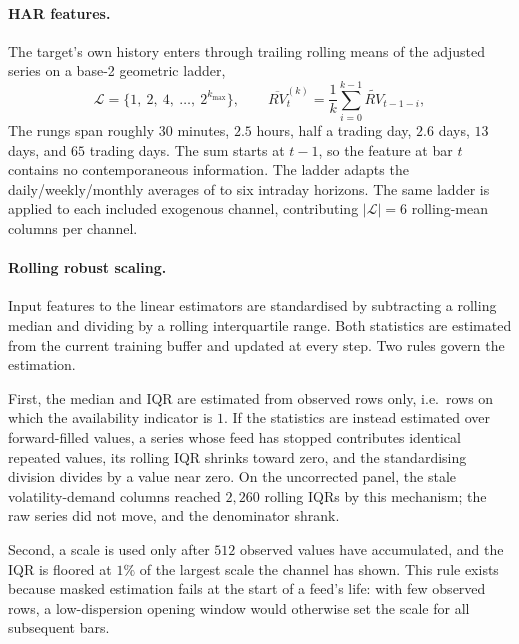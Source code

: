 \paragraph{HAR features.}
The target's own history enters through trailing rolling means of the
adjusted series on a base-2 geometric ladder,
\begin{equation}
    \mathcal{L} = \{1,\ 2,\ 4,\ \ldots,\ 2^{k_{\max}}\},
    \qquad
    \overline{RV}^{(k)}_t = \frac{1}{k}\sum_{i=0}^{k-1}\widetilde{RV}_{t-1-i},
    \label{eq:dp_har}
\end{equation}
The rungs span roughly $30$ minutes, $2.5$ hours, half a trading day,
$2.6$ days, $13$ days, and $65$ trading days. The sum starts at $t-1$, so
the feature at bar $t$ contains no contemporaneous information. The ladder
adapts the daily/weekly/monthly averages of \citet{Corsi2009} to six
intraday horizons. The same ladder is applied to each included exogenous
channel, contributing $|\mathcal{L}| = 6$ rolling-mean columns per
channel.

\paragraph{Rolling robust scaling.}
Input features to the linear estimators are standardised by subtracting a
rolling median and dividing by a rolling interquartile range. Both
statistics are estimated from the current training buffer and updated at
every step. Two rules govern the estimation.

First, the median and IQR are estimated from observed rows only, i.e.\
rows on which the availability indicator is $1$. If the statistics are
instead estimated over forward-filled values, a series whose feed has
stopped contributes identical repeated values, its rolling IQR shrinks
toward zero, and the standardising division divides by a value near zero.
On the uncorrected panel, the stale volatility-demand columns reached
$2{,}260$ rolling IQRs by this mechanism; the raw series did not move, and
the denominator shrank.

Second, a scale is used only after $512$ observed values have accumulated,
and the IQR is floored at $1\%$ of the largest scale the channel has
shown. This rule exists because masked estimation fails at the start of a
feed's life: with few observed rows, a low-dispersion opening window would
otherwise set the scale for all subsequent bars.

